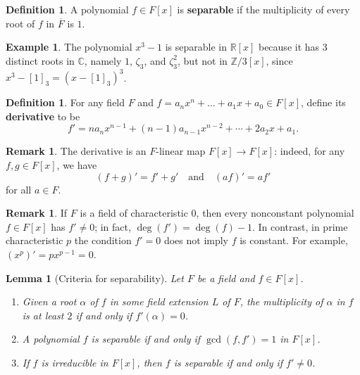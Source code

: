 \documentclass[12pt]{report}
\newtheorem{lemma}[theorem]{Lemma}
\numberwithin{equation}{section}
\numberwithin{theorem}{chapter}
\theoremstyle{definition}
\newtheorem{definition}[theorem]{Definition}
\newtheorem{example}[theorem]{Example}
\newtheorem*{basic properties}{Basic Properties}
\newtheorem*{Important Remark}{Important Remark}
\newtheorem{remark}[theorem]{Remark}
\newcommand{\df}[1]{{\bf #1}\index{#1}}
\newcommand{\C}{\mathbb{C}}
\begin{document}
\begin{definition}
	A polynomial $f \in F[x]$ is {\bf separable} if the multiplicity of every root of $f$ in $\overline{F}$ is $1$.
\end{definition}


\begin{example}
The polynomial $x^3-1$ is separable in $\mathbb{R}[x]$ because it has 3 distinct roots in $\C$, namely $1$, $\zeta_3$, and $\zeta_3^2$, but not in $\mathbb{Z}/3[x]$, since $x^3-[1]_3=(x-[1]_3)^3$.
\end{example}


\begin{definition}
For any field $F$ and $f = a_n x^n + \dots + a_1 x + a_0 \in F[x]$, define its \df{derivative} to be
$$f' = n a_n x^{n-1} + (n-1) a_{n-1} x^{n-2} + \cdots + 2 a_2 x + a_1.$$
\end{definition}


\begin{remark}
The derivative is an $F$-linear map $F[x] \to F[x]$: indeed, for any $f, g \in F[x]$, we have
$$(f + g)' = f' + g' \quad \textrm{and} \quad (a f)' = a f'$$
for all $a \in F$.
\end{remark}


\begin{remark}
	If $F$ is a field of characteristic $0$, then every nonconstant polynomial $f \in F[x]$ has $f' \neq 0$; in fact, $\deg(f') = \deg(f) -1$. In contrast, in prime characteristic $p$ the condition $f' = 0$ does not imply $f$ is constant. For example, $(x^p)' = px^{p-1} = 0$.
\end{remark}



\begin{lemma}[Criteria for separability]\label{criteria separability}
Let $F$ be a field and $f \in F[x]$.
\begin{enumerate}[label=\alph*),leftmargin=15pt]
\item Given a root $\alpha$ of $f$ in some field extension $L$ of $F$, the multiplicity of $\alpha$ in $f$ is at least $2$ if and only if $f'(\alpha) = 0$.
\item A polynomial $f$ is separable if and only if $\gcd(f, f') = 1$ in $F[x]$. 
\item If $f$ is irreducible in $F[x]$, then $f$ is separable if and only if $f' \neq 0$.
\end{enumerate}
\end{lemma}
\end{document}
